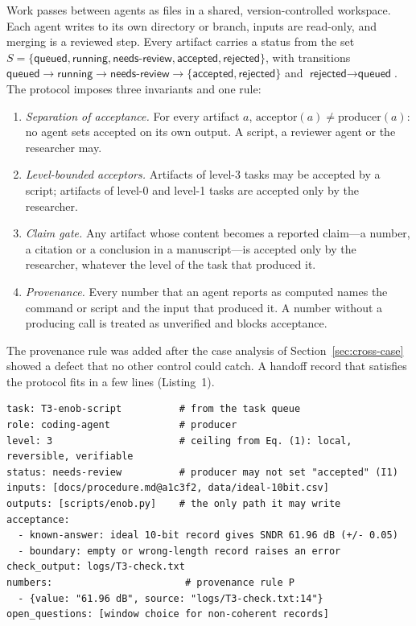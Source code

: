 Work passes between agents as files in a shared, version-controlled workspace. Each
agent writes to its own directory or branch, inputs are read-only, and merging is a
reviewed step. Every artifact carries a status from the set
$S=\{\textsf{queued},\textsf{running},\textsf{needs-review},\textsf{accepted},\textsf{rejected}\}$,
with transitions $\textsf{queued}\rightarrow\textsf{running}\rightarrow\textsf{needs-review}
\rightarrow\{\textsf{accepted},\textsf{rejected}\}$ and $\textsf{rejected}\rightarrow\textsf{queued}$.
The protocol imposes three invariants and one rule:
\begin{enumerate}[leftmargin=*,label=\textbf{I\arabic*}]
  \item \textit{Separation of acceptance.} For every artifact $a$,
    $\mathrm{acceptor}(a)\neq\mathrm{producer}(a)$: no agent sets \textsf{accepted} on its
    own output. A script, a reviewer agent or the researcher may.
  \item \textit{Level-bounded acceptors.} Artifacts of level-3 tasks may be accepted by a
    script; artifacts of level-0 and level-1 tasks are accepted only by the researcher.
  \item \textit{Claim gate.} Any artifact whose content becomes a reported
    claim---a number, a citation or a conclusion in a manuscript---is accepted only by the
    researcher, whatever the level of the task that produced it.
  \item[\textbf{P}] \textit{Provenance.} Every number that an agent reports as computed
    names the command or script and the input that produced it. A number without a
    producing call is treated as unverified and blocks acceptance.
\end{enumerate}
The provenance rule was added after the case analysis of Section~\ref{sec:cross-case}
showed a defect that no other control could catch. A handoff record that satisfies the
protocol fits in a few lines (Listing~1).

\begin{lstlisting}[caption={An illustrative handoff record for the ENOB analysis script of
Section~\ref{sec:case-a}, written as YAML at the top of the artifact.}]
task: T3-enob-script          # from the task queue
role: coding-agent            # producer
level: 3                      # ceiling from Eq. (1): local, reversible, verifiable
status: needs-review          # producer may not set "accepted" (I1)
inputs: [docs/procedure.md@a1c3f2, data/ideal-10bit.csv]
outputs: [scripts/enob.py]    # the only path it may write
acceptance:
  - known-answer: ideal 10-bit record gives SNDR 61.96 dB (+/- 0.05)
  - boundary: empty or wrong-length record raises an error
check_output: logs/T3-check.txt
numbers:                       # provenance rule P
  - {value: "61.96 dB", source: "logs/T3-check.txt:14"}
open_questions: [window choice for non-coherent records]
\end{lstlisting}

